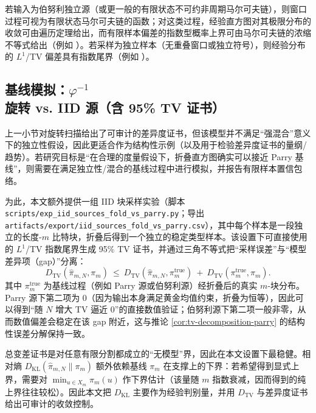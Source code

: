 \begin{remark}[伯努利源的极限与有限样本界的引用口径]\label{rem:bernoulli-source-guarantee}
若输入为伯努利独立源（或更一般的有限状态不可约非周期马尔可夫链），则窗口过程可视为有限状态马尔可夫链的函数；对这类过程，经验直方图对其极限分布的收敛可由遍历定理给出，而有限样本偏差的指数型概率上界可由马尔可夫链的浓缩不等式给出（例如 \cite{Paulin2015MarkovConcentration}）。若采样为独立样本（无重叠窗口或独立符号），则经验分布的 $L^1$/TV 偏差具有指数尾界（例如 \cite{WeissmanEtAl2003L1Empirical}）。
\end{remark}

\subsection{基线模拟：\texorpdfstring{$\varphi^{-1}$}{phi} 旋转 vs. IID 源（含 95\% TV 证书）}\label{subsec:exp-iid-baselines}
上一小节对旋转扫描给出了可审计的差异度证书，但该模型并不满足“强混合”意义下的独立性假设，因此更适合作为结构性示例（以及用于检验差异度证书的量纲/趋势）。若研究目标是“在合理的度量假设下，折叠直方图确实可以接近 Parry 基线”，则需要在满足独立性/混合的基线过程中进行模拟，并报告有限样本置信包络。

为此，本文额外提供一组 IID 块采样实验（脚本 \texttt{scripts/exp\_iid\_sources\_fold\_vs\_parry.py}；导出 \texttt{artifacts/export/iid\_sources\_fold\_vs\_parry.csv}），其中每个样本是一段独立的长度-$m$ 比特块，折叠后得到一个独立的稳定类型样本。该设置下可直接使用 \cite{WeissmanEtAl2003L1Empirical} 的 $L^1$/TV 指数尾界生成 95\% TV 证书，并通过三角不等式把“采样误差”与“模型差异项（gap）”分离：
\[
D_{\mathrm{TV}}(\hat{\pi}_{m,N},\pi_m)\ \le\ D_{\mathrm{TV}}(\hat{\pi}_{m,N},\pi_m^{\mathrm{true}})\ +\ D_{\mathrm{TV}}(\pi_m^{\mathrm{true}},\pi_m).
\]
其中 $\pi_m^{\mathrm{true}}$ 为基线过程（例如 Parry 源或伯努利源）经折叠后的真实 $m$-块分布。Parry 源下第二项为 $0$（因为输出本身满足黄金均值约束，折叠为恒等），因此可以得到“随 $N$ 增大 TV 逼近 0”的直接数值验证；伯努利源下第二项一般非零，从而数值偏差会稳定在该 gap 附近，这与推论 \ref{cor:tv-decomposition-parry} 的结构性误差分解保持一致。




\begin{remark}
总变差证书是对任意有限分割都成立的“无模型”界，因此在本文设置下最稳健。相对熵 $D_{\mathrm{KL}}(\hat{\pi}_{m,N}\|\pi_m)$ 额外依赖基线 $\pi_m$ 在支撑上的下界：若希望得到显式上界，需要对 $\min_{u\in X_m}\pi_m(u)$ 作下界估计（该量随 $m$ 指数衰减，因而得到的纯上界往往较松）。因此本文把 $D_{\mathrm{KL}}$ 主要作为经验判别量，并用 $D_{\mathrm{TV}}$ 与差异度证书给出可审计的收敛控制。
\end{remark}

